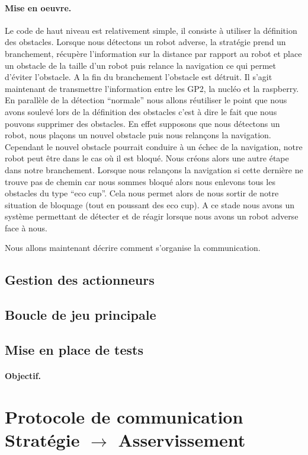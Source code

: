 \documentclass[a4paper,10pt]{report}
\begin{document}
\begin{spacing}{1.5}
\paragraph{Mise en oeuvre.} Le code de haut niveau est relativement simple, il
consiste à utiliser la définition des obstacles. Lorsque nous détectons un robot
adverse, la stratégie prend un branchement, récupère l'information sur la
distance par rapport au robot et place un obstacle de la taille d'un robot puis
relance la navigation ce qui permet d'éviter l'obstacle. A la fin du branchement
l'obstacle est détruit. Il s'agit maintenant de transmettre l'information entre
les GP2, la nucléo et la raspberry. En parallèle de la détection ``normale''
nous allons réutiliser le point que nous avons soulevé lors de la définition des
obstacles c'est à dire le fait que nous pouvons supprimer des obstacles. En
effet supposons que nous détectons un robot, nous plaçons un nouvel obstacle
puis nous relançons la navigation. Cependant le nouvel obstacle pourrait
conduire à un échec de la navigation, notre robot peut être dans le cas où il
est bloqué. Nous créons alors une autre étape dans notre branchement. Lorsque
nous relançons la navigation si cette dernière ne trouve pas de chemin car nous
sommes bloqué alors nous enlevons tous les obstacles du type ``eco cup''. Cela
nous permet alors de nous sortir de notre situation de bloquage (tout en
poussant des eco cup). A ce stade nous avons un système permettant de détecter
et de réagir lorsque nous avons un robot adverse face à nous.

Nous allons maintenant décrire comment
s'organise la communication.
\subsection{Gestion des actionneurs}
\subsection{Boucle de jeu principale}
\subsection{Mise en place de tests}
\paragraph{Objectif.}

\section{Protocole de communication Stratégie $\rightarrow$ Asservissement}

\end{spacing}
\end{document}

